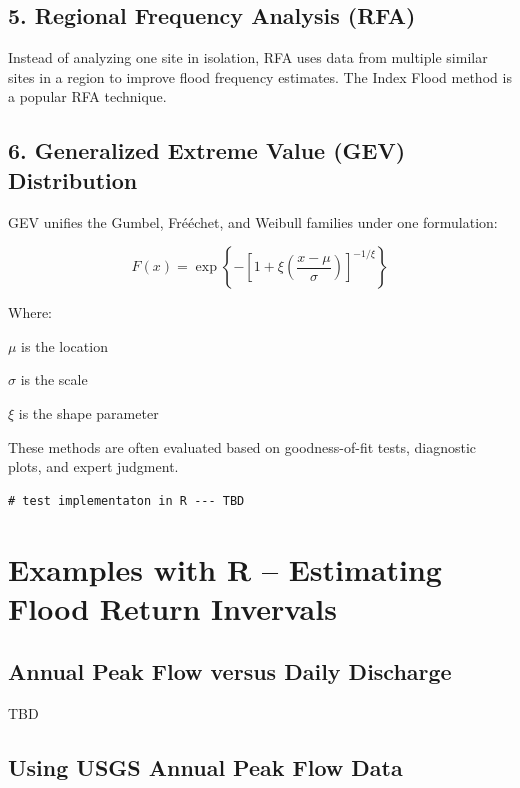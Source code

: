\documentclass{tufte-handout}\usepackage[]{graphicx}\usepackage[]{xcolor}
\newenvironment{itemize*}%
  {\begin{itemize}%
    \setlength{\itemsep}{0pt}%
    \setlength{\parskip}{0pt}}%
  {\end{itemize}}
\begin{document}
\subsection{5. Regional Frequency Analysis (RFA)}

Instead of analyzing one site in isolation, RFA uses data from multiple similar sites in a region to improve flood frequency estimates. The Index Flood method is a popular RFA technique.

\subsection{6. Generalized Extreme Value (GEV) Distribution}

GEV unifies the Gumbel, Fr\'{e}échet, and Weibull families under one formulation:

\[
F(x) = \exp\left\{ -\left[ 1 + \xi \left(\frac{x - \mu}{\sigma} \right) \right]^{-1/\xi} \right\}
\]

Where:
\begin{itemize*}
  \item \( \mu \) is the location
  \item \( \sigma \) is the scale
  \item \( \xi \) is the shape parameter
\end{itemize*}


These methods are often evaluated based on goodness-of-fit tests, diagnostic plots, and expert judgment.



\begin{verbatim}
# test implementaton in R --- TBD
\end{verbatim}

\section{Examples with R -- Estimating Flood Return Invervals}

\subsection{Annual Peak Flow versus Daily Discharge}

TBD




\subsection{Using USGS Annual Peak Flow Data}
\end{document}
